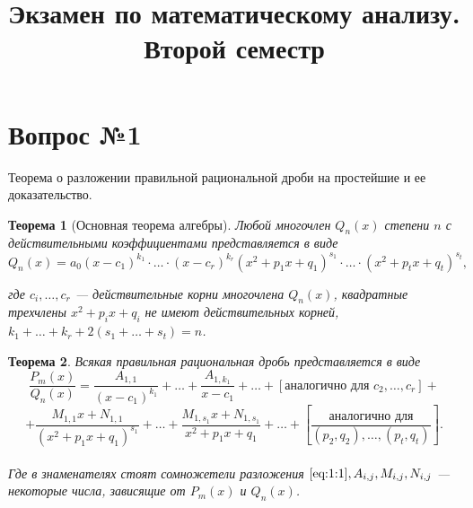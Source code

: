 \documentclass[12pt]{report}
\title{Экзамен по математическому анализу.\\Второй семестр}
\date{}
\numberwithin{equation}{section}
\newtheorem{theorem}{Теорема}[section]
\begin{document}
\maketitle
\tableofcontents

\thispagestyle{empty}


\newpage \section{Вопрос №1}  %
\begin{framed}
Теорема о разложении правильной рациональной дроби на простейшие и ее доказательство.\\
\end{framed}
\begin{theorem}[Основная теорема алгебры] Любой многочлен $Q_n(x)$ степени $n$ с действительными коэффициентами представляется в виде
\begin{equation}  \label{eq:1:1}
Q_n(x) = a_0(x-c_1)^{k_1} \cdot \ldots \cdot (x-c_r)^{k_r}(x^2 + p_1x + q_1)^{s_1} \cdot \ldots \cdot (x^2 + p_tx + q_t)^{s_t},
\end{equation}

где $c_i , \ldots , c_r$ — действительные корни многочлена $Q_n(x)$, квадратные трехчлены $x^2 + p_i x + q_i$ не имеют действительных корней, $k_1 + \dots + k_r + 2(s_1 + \dots + s_t) = n$. 
\end{theorem}


\begin{theorem}
Всякая правильная рациональная дробь представляется в виде
\[ \frac{P_m(x)}{Q_n(x)} = \frac{A_{1,1}}{(x-c_1)^{k_1}} + \dots + \frac{A_{1,k_1}}{x-c_1} + \dots + \left[ \text{аналогично для }c_2, \ldots, c_r\right] + \]
\[ + \frac{M_{1,1}x + N_{1,1}}{(x^2 + p_1x + q_1)^{s_1}} + \dots + \frac{M_{1,s_1}x + N_{1,s_1}}{x^2 + p_1x + q_1} + \dots + \left[ \frac{\text{аналогично для}}{(p_2,q_2), \ldots, (p_t,q_t)}\right]. \]\\

Где в знаменателях стоят сомножетели разложения $\eqref{eq:1:1}, A_{i,j} , M_{i,j} , N_{i,j}$ — некоторые
числа, зависящие от $P_m(x)$ и $Q_n(x)$.
\end{theorem}
\end{document}
